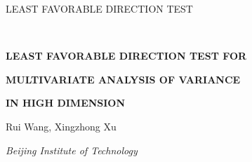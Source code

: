 \documentclass[12pt]{article} %
\theoremstyle{definition}
\begin{document}

\renewcommand{\baselinestretch}{2}


{\hfill {\footnotesize\rm LEAST FAVORABLE DIRECTION TEST} \hfill}

\renewcommand{\thefootnote}{}
$\ $\par


\fontsize{12}{14pt plus.8pt minus .6pt}\selectfont \vspace{0.8pc}
\centerline{\large\bf LEAST FAVORABLE DIRECTION TEST FOR }
\vspace{2pt} \centerline{\large\bf MULTIVARIATE ANALYSIS OF VARIANCE}
\vspace{2pt} \centerline{\large\bf IN HIGH DIMENSION}
\vspace{.4cm} \centerline{
    Rui Wang, Xingzhong Xu
} \vspace{.4cm} \centerline{\it
Beijing Institute of Technology
}
 \vspace{.55cm} \fontsize{9}{11.5pt plus.8pt minus
.6pt}\selectfont

\end{document}
